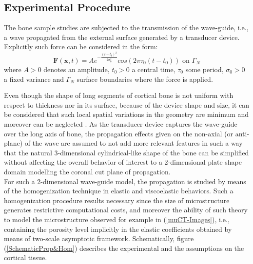 \subsection{Experimental Procedure}
The bone sample studies are subjected to the transmission of the wave-guide, i.e., a wave propagated from the external surface generated by a transducer device. 
Explicitly such force can be considered in the form:
\begin{equation*}
    \mathbf{F}(\mathbf{x},t) = A e^{-\frac{(t-t_0)^2}{2\sigma_0^2}} cos(2 \pi \tau_0 (t-t_0)) \text{ on } \Gamma_N
\end{equation*}
where $A > 0$ denotes an amplitude, $t_0 > 0$ a central time, $\tau_0$ some period, $\sigma_0>0$ a fixed variance and $\Gamma_N$ surface boundaries where the force is applied.

Even though the shape of long segments of cortical bone is not uniform with respect to thickness nor in its surface, because of the device shape and size, it can be considered that such local spatial variations in the geometry are minimum and moreover can be neglected \cite{Foiret2014}. As the transducer device captures the wave-guide over the long axis of bone, the propagation effects given on the non-axial (or anti-plane) of the wave are assumed to not add more relevant features in such a way that the natural 3-dimensional cylindrical-like shape of the bone can be simplified without affecting the overall behavior of interest to a 2-dimensional plate shape domain modelling the coronal cut plane of propagation. \\

For such a 2-dimensional wave-guide model, the propagation is studied by means of the homogenization technique in elastic and viscoelastic behaviors. Such a homogenization procedure results necessary since the size of microstructure generates restrictive computational costs, and moreover the ability of such theory to model the microstructure observed for example in (\ref{muCT-Images}), i.e., containing the porosity level implicitly in the elastic coefficients obtained by means of two-scale asymptotic framework.  Schematically, figure (\ref{SchematicProp&Hom}) describes the experimental and the assumptions on the cortical tissue. \\

